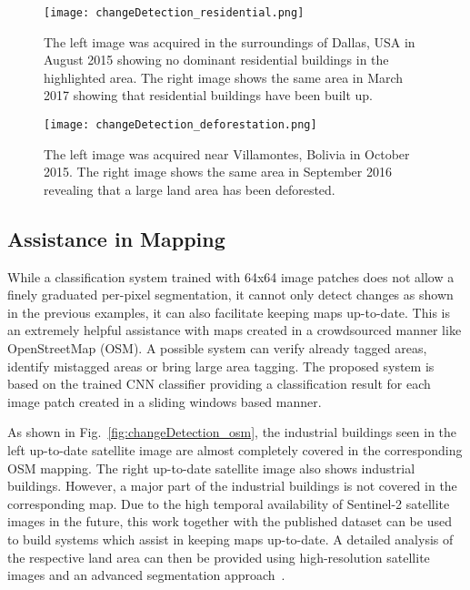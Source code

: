 \documentclass[journal]{IEEEtran}
\begin{document}

\begin{figure}
	\centering
	\texttt{[image: changeDetection\_residential.png]}
	\caption{The left image was acquired in the surroundings of Dallas, USA in August 2015 showing no dominant residential buildings in the highlighted area. The right image shows the same area in March 2017 showing that residential buildings have been built up.}
	
	\label{fig:changeDetection_residential}
\end{figure}

\begin{figure}[h!]
	\centering
	\texttt{[image: changeDetection\_deforestation.png]}
	\caption{The left image was acquired near Villamontes, Bolivia in October 2015. The right image shows the same area in September 2016 revealing that a large land area has been deforested.}
	\label{fig:changeDetection_deforestation}
\end{figure}


\subsection{Assistance in Mapping}
While a classification system trained with 64x64 image patches does not allow a finely graduated per-pixel segmentation, it cannot only detect changes as shown in the previous examples, it can also facilitate keeping maps up-to-date. This is an extremely helpful assistance with maps created in a crowdsourced manner like OpenStreetMap (OSM). A possible system can verify already tagged areas, identify mistagged areas or bring large area tagging. The proposed system is based on the trained CNN classifier providing a classification result for each image patch created in a sliding windows based manner.

As shown in Fig.~\ref{fig:changeDetection_osm}, the industrial buildings seen in the left up-to-date satellite image are almost completely covered in the corresponding OSM mapping. The right up-to-date satellite image also shows industrial buildings. However, a major part of the industrial buildings is not covered in the corresponding map. Due to the high temporal availability of Sentinel-2 satellite images in the future, this work together with the published dataset can be used to build systems which assist in keeping maps up-to-date. A detailed analysis of the respective land area can then be provided using high-resolution satellite images and an advanced segmentation approach~\cite{bischke2017multitask_buildings, Kampffmeyer_2016_CVPR_Workshops}.
\end{document}
